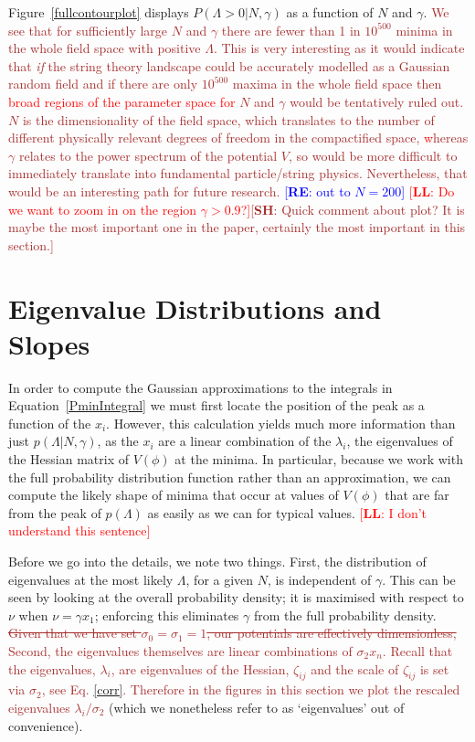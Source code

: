 \documentclass[12pt]{article}
\newcommand{\re}[1]{\textcolor{blue}{[{\bf RE}: #1]}}
\newcommand{\lfl}[1]{\textcolor{red}{[{\bf LL}: #1]}}
\newcommand{\SH}[1]{\textcolor{brown}{[{\bf SH}: #1]}}
\newcommand{\sh}[1]{\textcolor{brown}{#1}}
\newcommand{\LFL}[1]{\textcolor{red}{#1}}
\begin{document}
Figure~\ref{fullcontourplot} displays  $P(\Lambda >0 |N,\gamma)$ as a function of $N$ and $\gamma$. \sh{We see that for sufficiently large $N$ and $\gamma$ there are fewer than 1 in $10^{500}$ minima in the whole field space with positive $\Lambda$. This is very interesting as it would indicate that \emph{if} the string theory landscape could be accurately modelled as a Gaussian random field and if there are only $10^{500}$ maxima in the whole field space then \LFL{broad regions of the parameter space for} $N$ and $\gamma$ would be tentatively ruled out. $N$ is the dimensionality of the field space, which translates to the number of different physically relevant degrees of freedom in the compactified space, \LFL{w}hereas $\gamma$ relates to the power spectrum of the potential $V$, so would be more difficult to immediately translate into fundamental particle/string physics. Nevertheless, that would be an interesting path for future research.} \re{out to $N=200$} \lfl{Do we want to zoom in on the region $\gamma > 0.9$?}\SH{Quick comment about plot? It is maybe the most important one in the paper, certainly the most important in this section.}


\section{Eigenvalue Distributions and Slopes} 

In order to compute the Gaussian  approximations to the integrals in Equation~\ref{PminIntegral} we must first locate the position of the peak as a function of the $x_i$. However, this calculation yields much more information than just $p(\Lambda  |N,\gamma)$, as the $x_i$ are a linear combination of the $\lambda_i$, the eigenvalues of the Hessian matrix of $V(\phi)$ at the minima. In particular, because we work with the full probability distribution function rather than an approximation, we can compute the likely shape of minima that occur at values of $V(\phi)$ that  are  far from the peak of $p(\Lambda)$ as easily as we can for typical values. \lfl{I don't understand this sentence}

Before we go into the details, we note two things. First, the distribution of eigenvalues at the most likely $\Lambda$, for a given $N$, is independent of $\gamma$. This can be seen by looking at the overall probability density; it is maximised with respect to $\nu$ when $\nu = \gamma x_1$; enforcing this eliminates $\gamma$ from the full  probability density. \sh{\sout{Given that we have set $\sigma_0 = \sigma_1=1$, our potentials are effectively dimensionless,} Second, the eigenvalues themselves are linear combinations of $\sigma_2x_n$. Recall that the eigenvalues, $\lambda_i$, are eigenvalues of the Hessian, $\zeta_{ij}$ and the scale of $\zeta_{ij}$ is set via $\sigma_2$, see Eq. \eqref{corr}. Therefore in the figures in this section we plot the rescaled eigenvalues $\lambda_i/\sigma_2$} (which we nonetheless refer to as `eigenvalues' out of convenience).
\end{document}
